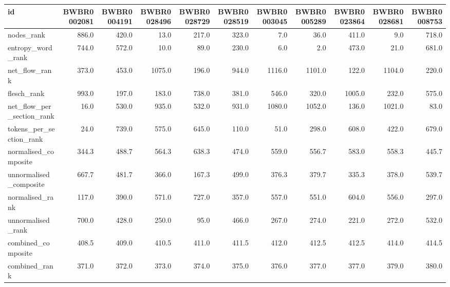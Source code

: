 \begin{tabular}{lrrrrrrrrrr}
\toprule
id & BWBR0002081 & BWBR0004191 & BWBR0028496 & BWBR0028729 & BWBR0028519 & BWBR0003045 & BWBR0005289 & BWBR0023864 & BWBR0028681 & BWBR0008753 \\
\midrule
nodes\_rank & 886.0 & 420.0 & 13.0 & 217.0 & 323.0 & 7.0 & 36.0 & 411.0 & 9.0 & 718.0 \\
\cline{1-11}
entropy\_word\_rank & 744.0 & 572.0 & 10.0 & 89.0 & 230.0 & 6.0 & 2.0 & 473.0 & 21.0 & 681.0 \\
\cline{1-11}
net\_flow\_rank & 373.0 & 453.0 & 1075.0 & 196.0 & 944.0 & 1116.0 & 1101.0 & 122.0 & 1104.0 & 220.0 \\
\cline{1-11}
flesch\_rank & 993.0 & 197.0 & 183.0 & 738.0 & 381.0 & 546.0 & 320.0 & 1005.0 & 232.0 & 575.0 \\
\cline{1-11}
net\_flow\_per\_section\_rank & 16.0 & 530.0 & 935.0 & 532.0 & 931.0 & 1080.0 & 1052.0 & 136.0 & 1021.0 & 83.0 \\
\cline{1-11}
tokens\_per\_section\_rank & 24.0 & 739.0 & 575.0 & 645.0 & 110.0 & 51.0 & 298.0 & 608.0 & 422.0 & 679.0 \\
\cline{1-11}
normalised\_composite & 344.3 & 488.7 & 564.3 & 638.3 & 474.0 & 559.0 & 556.7 & 583.0 & 558.3 & 445.7 \\
\cline{1-11}
unnormalised\_composite & 667.7 & 481.7 & 366.0 & 167.3 & 499.0 & 376.3 & 379.7 & 335.3 & 378.0 & 539.7 \\
\cline{1-11}
normalised\_rank & 117.0 & 390.0 & 571.0 & 727.0 & 357.0 & 557.0 & 551.0 & 604.0 & 556.0 & 297.0 \\
\cline{1-11}
unnormalised\_rank & 700.0 & 428.0 & 250.0 & 95.0 & 466.0 & 267.0 & 274.0 & 221.0 & 272.0 & 532.0 \\
\cline{1-11}
combined\_composite & 408.5 & 409.0 & 410.5 & 411.0 & 411.5 & 412.0 & 412.5 & 412.5 & 414.0 & 414.5 \\
\cline{1-11}
combined\_rank & 371.0 & 372.0 & 373.0 & 374.0 & 375.0 & 376.0 & 377.0 & 377.0 & 379.0 & 380.0 \\
\cline{1-11}
\bottomrule
\end{tabular}
